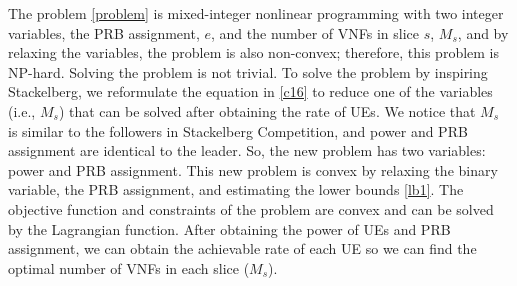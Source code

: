 \documentclass[lettersize,journal]{IEEEtran}
\begin{document}
The problem \eqref{problem} is mixed-integer nonlinear programming with two integer variables, the PRB assignment, $e$, and the number of VNFs in slice $s$, $M_s$, and by relaxing the variables, the problem is also non-convex; therefore, this problem is NP-hard. Solving the problem is not trivial. To solve the problem by inspiring Stackelberg, we reformulate the equation in \eqref{c16} to reduce one of the variables (i.e., $M_s$) that can be solved after obtaining the rate of UEs. We notice that $M_s$ is similar to the followers in Stackelberg Competition, and power and PRB assignment are identical to the leader. So, the new problem has two variables: power and PRB assignment. This new problem is convex by relaxing the binary variable, the PRB assignment, and estimating the lower bounds \eqref{lb1}. The objective function and constraints of the problem are convex and can be solved by the Lagrangian function. After obtaining the power of UEs and PRB assignment, we can obtain the achievable rate of each UE so we can find the optimal number of VNFs in each slice ($M_s$).
\end{document}
